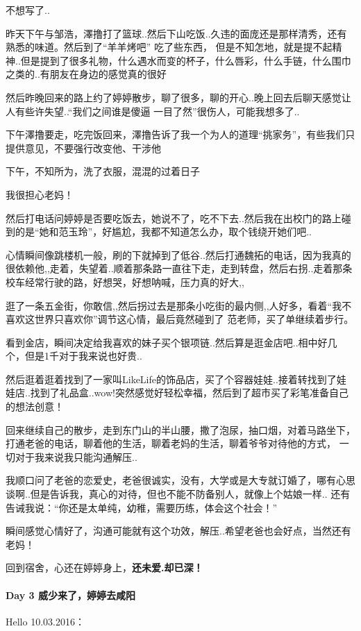 \documentclass[UTF8,a4paper,8pt]{ctexbook}
\begin{document}
	 	 不想写了..
	 	 
	 	 昨天下午与邹浩，澤撸打了篮球..然后下山吃饭..久违的面庞还是那样清秀，还有熟悉的味道。然后到了“羊羊烤吧” 吃了些东西， 但是不知怎地，就是提不起精神..但是提到了很多礼物，什么遇水而变的杯子，什么唇彩，什么手链，什么围巾之类的..有朋友在身边的感觉真的很好
	 	 
	 	 然后昨晚回来的路上约了婷婷散步，聊了很多，聊的开心..晚上回去后聊天感觉让人有些许失望..“我们之间谁是傻逼  一目了然”很伤人，可能我想多了..
	 	 
	 	 下午澤撸要走，吃完饭回来，澤撸告诉了我一个为人的道理“挑家务”，有些我们只提供意见，不要强行改变他、干涉他
	 	 
	 	 下午，不知所为，洗了衣服，混混的过着日子
	 	 
		 我很担心老妈！
	 	 
	 	 然后打电话问婷婷是否要吃饭去，她说不了，吃不下去..然后我在出校门的路上碰到的是“她和范玉玲”，好尴尬，我都不知道怎么办，取个钱绕开她们吧..
	 	 
	 	 心情瞬间像跳楼机一般，刷的下就掉到了低谷..然后打通魏拓的电话，因为我真的很依赖他,,走着，失望着..顺着那条路一直往下走，走到转盘，然后右拐..走着那条校车经常行驶的路，好想哭，好想呐喊，压力真的好大,,
	 	 
	 	 逛了一条五金街，你敢信,,然后拐过去是那条小吃街的最内侧,,人好多，看着“我不喜欢这世界只喜欢你”调节这心情，最后竟然碰到了 范老师，买了单继续着步行。
	 	 
	 	 看到金店，瞬间决定给我喜欢的妹子买个银项链..然后算是逛金店吧..相中好几个，但是1千对于我来说也好贵..
	 	 
	 	 然后逛着逛着找到了一家叫LikeLife的饰品店，买了个容器娃娃..接着转找到了娃娃店..找到了礼品盒..wow!突然感觉好轻松幸福，然后到了超市买了彩笔准备自己的想法创意！
	 	 
	 	 回来继续自己的散步，走到东门山的半山腰，撒了泡尿，抽口烟，对着马路坐下，打通老爸的电话，聊着他的生活，聊着老妈的生活，聊着爷爷对待他的方式， 一切对于我来说我只能沟通解压.. 
	 	 
	 	 我顺口问了老爸的恋爱史，老爸很诚实，没有，大学或是大专就订婚了，哪有心思谈啊..但是告诉我，真心的对待，但也不能不防备别人，就像上个姑娘一样..  还有告诫我说：“你还是太单纯，幼稚，需要历练，体会这个社会！”
	 	 
	 	 瞬间感觉心情好了，沟通可能就有这个功效，解压..希望老爸也会好点，当然还有老妈！
	 	 
	 	 回到宿舍，心还在婷婷身上，\textbf{还未爱.却已深！}	 	 
 	 \paragraph{Day 3   威少来了，婷婷去咸阳    \quad     }
	 	 Hello 10.03.2016：
	 	 
\end{document}
